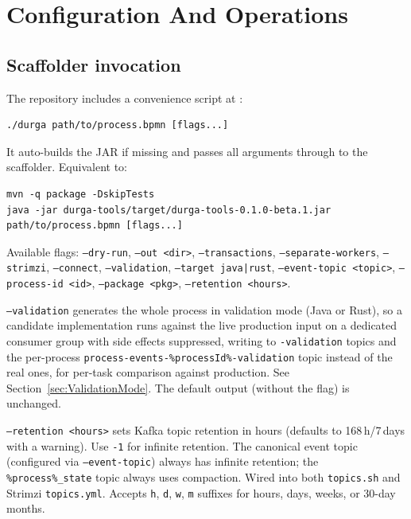 \section{Configuration And Operations}
\label{sec:ConfigurationOperations}

\subsection{Scaffolder invocation}

The repository includes a convenience script at :

\begin{verbatim}
./durga path/to/process.bpmn [flags...]
\end{verbatim}

It auto-builds the JAR if missing and passes all arguments through to the
scaffolder. Equivalent to:

\begin{verbatim}
mvn -q package -DskipTests
java -jar durga-tools/target/durga-tools-0.1.0-beta.1.jar path/to/process.bpmn [flags...]
\end{verbatim}

Available flags: \texttt{--dry-run}, \texttt{--out <dir>},
\texttt{--transactions}, \texttt{--separate-workers}, \texttt{--strimzi},
\texttt{--connect}, \texttt{--validation}, \texttt{--target java|rust},
\texttt{--event-topic <topic>}, \texttt{--process-id <id>},
\texttt{--package <pkg>}, \texttt{--retention <hours>}.

\texttt{--validation} generates the whole process in validation mode (Java or Rust), so
a candidate implementation runs against the live production input on a dedicated consumer
group with side effects suppressed, writing to \texttt{-validation} topics and the
per-process \texttt{process-events-\%processId\%-validation} topic instead of the real ones, for per-task comparison
against production. See Section~\ref{sec:ValidationMode}. The default output (without the
flag) is unchanged.

\texttt{--retention <hours>} sets Kafka topic retention in hours
(defaults to 168\,h/7\,days with a warning). Use \texttt{-1} for
infinite retention. The canonical event topic (configured via
\texttt{--event-topic}) always has infinite retention; the
\texttt{\%process\%\_state} topic always uses compaction. Wired
into both \texttt{topics.sh} and Strimzi \texttt{topics.yml}.
Accepts \texttt{h}, \texttt{d}, \texttt{w}, \texttt{m} suffixes
for hours, days, weeks, or 30-day months.

